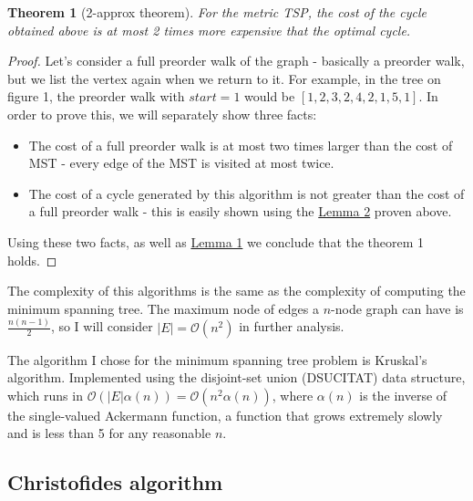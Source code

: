\documentclass[12pt,twoside,notitlepage]{report}
\newtheorem{theorem}{Theorem}
\begin{document}
\begin{theorem}[2-approx theorem]

For the metric TSP, the cost of the cycle obtained above is at most 2 times more expensive that the optimal cycle. \\

\end{theorem}

\begin{proof}

Let's consider a full preorder walk  of the graph - basically a preorder walk, but we list the vertex again when we return to it. For example, in the tree on figure 1, the preorder walk with $start = 1$ would be $[1, 2, 3, 2, 4, 2, 1, 5, 1]$. In order to prove this, we will separately show three facts:

\begin{itemize}

\item The cost of a full preorder walk is at most two times larger than the cost of MST - every edge of the MST is visited at most twice.

\item The cost of a cycle generated by this algorithm is not greater than the cost of a full preorder walk - this is easily shown using the \hyperref[shortcutting]{Lemma 2} proven above.

\end{itemize}

Using these two facts, as well as \hyperref[mstlemma]{Lemma 1} we conclude that the theorem 1 holds.

\end{proof}

The complexity of this algorithms is the same as the complexity of computing the minimum spanning tree. The maximum node of edges a $n$-node graph can have is $\frac{n(n - 1)}{2}$, so I will consider $|E| = \mathcal{O}(n^2)$ in further analysis.

The algorithm I chose for the minimum spanning tree problem is Kruskal's algorithm. Implemented using the disjoint-set union (DSUCITAT) data structure, which runs in $ \mathcal{O}(|E|\alpha(n)) = \mathcal{O}(n^2\alpha(n)) $, where $\alpha(n)$ is the inverse of the single-valued Ackermann function, a function that grows extremely slowly and is less than 5 for any reasonable $n$.

\subsection{Christofides algorithm}
\end{document}
